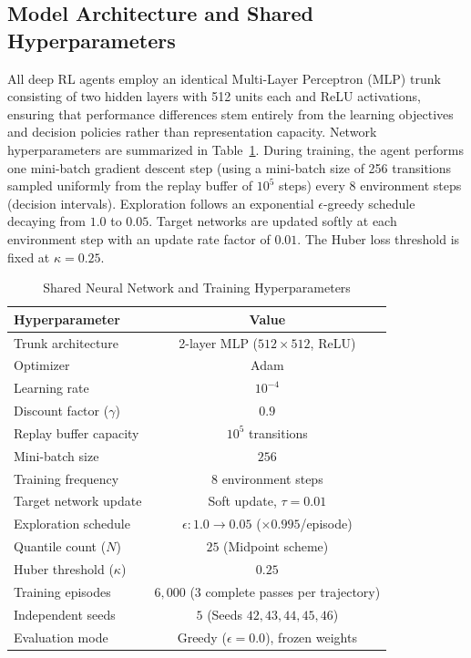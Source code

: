 \documentclass{ieeetmlcn}
\begin{document}
\subsection{Model Architecture and Shared Hyperparameters}
All deep RL agents employ an identical Multi-Layer Perceptron (MLP) trunk consisting of two hidden layers with 512 units each and ReLU activations, ensuring that performance differences stem entirely from the learning objectives and decision policies rather than representation capacity. Network hyperparameters are summarized in Table~\ref{tab:hparams}. During training, the agent performs one mini-batch gradient descent step (using a mini-batch size of 256 transitions sampled uniformly from the replay buffer of $10^5$ steps) every 8 environment steps (decision intervals). Exploration follows an exponential $\epsilon$-greedy schedule decaying from $1.0$ to $0.05$. Target networks are updated softly at each environment step with an update rate factor of $0.01$. The Huber loss threshold is fixed at $\kappa = 0.25$.

\begin{table}[htbp]
\caption{Shared Neural Network and Training Hyperparameters}
\label{tab:hparams}
\centering
\begin{tabular}{|l|c|}
\hline
\textbf{Hyperparameter} & \textbf{Value} \\
\hline
Trunk architecture       & 2-layer MLP ($512 \times 512$, ReLU) \\
Optimizer               & Adam \\
Learning rate           & $10^{-4}$ \\
Discount factor ($\gamma$) & $0.9$ \\
Replay buffer capacity  & $10^{5}$ transitions \\
Mini-batch size         & $256$ \\
Training frequency      & $8$ environment steps \\
Target network update   & Soft update, $\tau = 0.01$ \\
Exploration schedule    & $\epsilon: 1.0 \to 0.05$ ($\times 0.995$/episode) \\
Quantile count ($N$)    & $25$ (Midpoint scheme) \\
Huber threshold ($\kappa$) & $0.25$ \\
Training episodes       & $6{,}000$ (3 complete passes per trajectory) \\
Independent seeds       & $5$ (Seeds $42, 43, 44, 45, 46$) \\
Evaluation mode         & Greedy ($\epsilon = 0.0$), frozen weights \\
\hline
\end{tabular}
\end{table}
\end{document}
